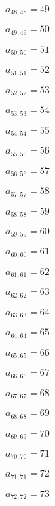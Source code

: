 \documentclass[a4paper,12pt]{article}
\begin{document}
$a _{ 48, 48 } = 49$

$a _{ 49, 49 } = 50$

$a _{ 50, 50 } = 51$

$a _{ 51, 51 } = 52$

$a _{ 52, 52 } = 53$

$a _{ 53, 53 } = 54$

$a _{ 54, 54 } = 55$

$a _{ 55, 55 } = 56$

$a _{ 56, 56 } = 57$

$a _{ 57, 57 } = 58$

$a _{ 58, 58 } = 59$

$a _{ 59, 59 } = 60$

$a _{ 60, 60 } = 61$

$a _{ 61, 61 } = 62$

$a _{ 62, 62 } = 63$

$a _{ 63, 63 } = 64$

$a _{ 64, 64 } = 65$

$a _{ 65, 65 } = 66$

$a _{ 66, 66 } = 67$

$a _{ 67, 67 } = 68$

$a _{ 68, 68 } = 69$

$a _{ 69, 69 } = 70$

$a _{ 70, 70 } = 71$

$a _{ 71, 71 } = 72$

$a _{ 72, 72 } = 73$
\end{document}
